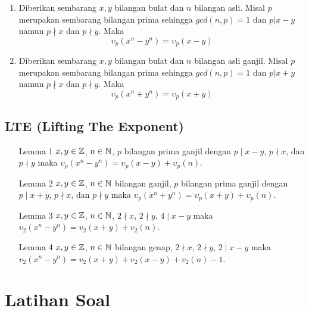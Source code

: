 \documentclass[11pt]{scrartcl}
\begin{document}
\begin{enumerate}[resume]
    \item Diberikan sembarang $x,y$ bilangan bulat dan $n$ bilangan asli. Misal $p$ merupakan sembarang bilangan prima sehingga $gcd(n,p)=1$ dan $p|x-y$ namun $p\nmid x$ dan $p\nmid y$. Maka
    \[\upsilon_p(x^n-y^n) = \upsilon_p(x-y)\]
    \item Diberikan sembarang $x,y$ bilangan bulat dan $n$ bilangan asli ganjil. Misal $p$ merupakan sembarang bilangan prima sehingga $gcd(n,p)=1$ dan $p|x+y$ namun $p\nmid x$ dan $p\nmid y$. Maka
    \[\upsilon_p(x^n+y^n) = \upsilon_p(x+y)\]
\end{enumerate}

\subsection{LTE (Lifting The Exponent)}
\begin{enumerate}
    \item [Lemma 1] $x,y \in \mathbb Z$, $n \in \mathbb N$, $p$ bilangan prima ganjil dengan $p \mid x-y$, $p \nmid x$, dan $p \nmid y$ maka $\upsilon_p(x^n-y^n)=\upsilon_p(x-y)+\upsilon_p(n)$.
    \item [Lemma 2] $x,y \in \mathbb Z$, $n \in \mathbb N$ bilangan ganjil, $p$ bilangan prima ganjil dengan $p \mid x+y$, $p \nmid x$, dan $p \nmid y$ maka $\upsilon_p(x^n+y^n)=\upsilon_p(x+y)+\upsilon_p(n)$.
    \item [Lemma 3] $x,y \in \mathbb Z$, $n \in \mathbb N$, $2 \nmid x$, $2 \nmid y$,  $4 \mid x-y$  maka $v_2(x^n-y^n)=v_2(x+y)+v_2(n)$.
    \item [Lemma 4] $x,y \in \mathbb Z$, $n \in \mathbb N$ bilangan genap, $2 \nmid x$, $2 \nmid y$,  $2 \mid x-y$ maka $v_2(x^n-y^n)=v_2(x+y)+v_2(x-y)+v_2(n)-1$.
\end{enumerate}

\section{Latihan Soal}
\end{document}
